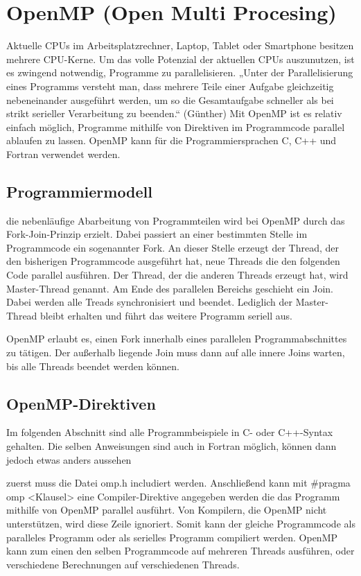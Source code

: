 \documentclass[../main.tex]{subfiles}
\begin{document}
\section{OpenMP (Open Multi Procesing)}

Aktuelle CPUs im Arbeitsplatzrechner, Laptop, Tablet oder Smartphone besitzen mehrere CPU-Kerne. Um das volle Potenzial der aktuellen CPUs auszunutzen, ist es zwingend notwendig, Programme zu parallelisieren.
„Unter der Parallelisierung eines Programms versteht man, dass mehrere Teile einer Aufgabe gleichzeitig nebeneinander ausgeführt werden, um so die Gesamtaufgabe schneller als bei strikt serieller Verarbeitung zu beenden.“ (Günther)
Mit OpenMP ist es relativ einfach möglich, Programme mithilfe von Direktiven im Programmcode parallel ablaufen zu lassen. OpenMP kann für die Programmiersprachen C, C++ und Fortran verwendet werden.

\subsection{Programmiermodell}

die nebenläufige Abarbeitung von Programmteilen wird bei OpenMP durch das Fork-Join-Prinzip erzielt. Dabei passiert an einer bestimmten Stelle im Programmcode ein sogenannter Fork. An dieser Stelle erzeugt der Thread, der den bisherigen Programmcode ausgeführt hat, neue Threads die den folgenden Code parallel ausführen. Der Thread, der die anderen Threads erzeugt hat, wird Master-Thread genannt. Am Ende des parallelen Bereichs geschieht ein Join. Dabei werden alle Treads synchronisiert und beendet. Lediglich der Master-Thread bleibt erhalten und führt das weitere Programm seriell aus.

OpenMP erlaubt es, einen Fork innerhalb eines parallelen Programmabschnittes zu tätigen. Der außerhalb liegende Join muss dann auf alle innere Joins warten, bis alle Threads beendet werden können.

\subsection{OpenMP-Direktiven}

Im folgenden Abschnitt sind alle Programmbeispiele in C- oder C++-Syntax gehalten. Die selben Anweisungen sind auch in Fortran möglich, können dann jedoch etwas anders aussehen

zuerst muss die Datei omp.h includiert werden. Anschließend kann mit \#pragma omp <Klausel> eine Compiler-Direktive angegeben werden die das Programm mithilfe von OpenMP parallel ausführt. Von Kompilern, die OpenMP nicht unterstützen, wird diese Zeile ignoriert. Somit kann der gleiche Programmcode als paralleles Programm oder als serielles Programm compiliert werden.
OpenMP kann zum einen den selben Programmcode auf mehreren Threads ausführen, oder verschiedene Berechnungen auf verschiedenen Threads. 
\end{document}

